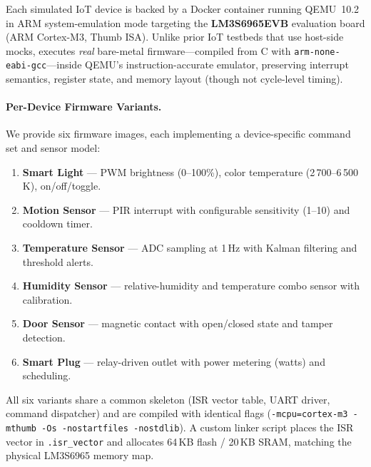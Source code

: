 Each simulated IoT device is backed by a Docker container running
QEMU~10.2 in ARM system-emulation mode targeting the
\textbf{LM3S6965EVB} evaluation board (ARM Cortex-M3, Thumb ISA).
Unlike prior IoT testbeds that use host-side mocks, \sys{} executes
\emph{real} bare-metal firmware---compiled from C with
\texttt{arm-none-eabi-gcc}---inside QEMU's instruction-accurate
emulator, preserving interrupt semantics, register state, and
memory layout (though not cycle-level timing).

\paragraph{Per-Device Firmware Variants.}
We provide six firmware images, each implementing a device-specific
command set and sensor model:
\begin{enumerate}[leftmargin=*]
  \item \textbf{Smart Light} --- PWM brightness (0--100\%), color
    temperature (2\,700--6\,500\,K), on/off/toggle.
  \item \textbf{Motion Sensor} --- PIR interrupt with configurable
    sensitivity (1--10) and cooldown timer.
  \item \textbf{Temperature Sensor} --- ADC sampling at 1\,Hz with
    Kalman filtering and threshold alerts.
  \item \textbf{Humidity Sensor} --- relative-humidity and
    temperature combo sensor with calibration.
  \item \textbf{Door Sensor} --- magnetic contact with
    open/closed state and tamper detection.
  \item \textbf{Smart Plug} --- relay-driven outlet with power
    metering (watts) and scheduling.
\end{enumerate}
All six variants share a common skeleton (ISR vector table, UART
driver, command dispatcher) and are compiled with identical flags
(\texttt{-mcpu=cortex-m3 -mthumb -Os -nostartfiles -nostdlib}).
A custom linker script places the ISR vector in \texttt{.isr\_vector}
and allocates 64\,KB flash / 20\,KB SRAM, matching the physical
LM3S6965 memory map.

